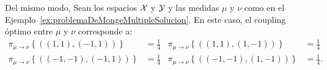 {{\begin{example}
	  \end{example}

	  \begin{example}
		  Del mismo modo, Sean los espacios $\mathcal{X}$ y $\mathcal{Y}$ y las medidas $\mu$ y $\nu$ como en el Ejemplo~\ref*{ex:problemaDeMongeMultipleSolucion}. En este caso, el coupling óptimo entre $\mu$ y $\nu$ corresponde a:
		  \begin{align*}
			  \pi_{\mu \to \nu}\left\{ ((1, 1), (-1, 1)) \right\}   & = \frac{1}{4} & \pi_{\mu \to \nu}\left\{ ((1, 1), (1, -1)) \right\}   & = \frac{1}{4}  \\
			  \pi_{\mu \to \nu}\left\{ ((-1, -1), (-1, 1)) \right\} & = \frac{1}{4} & \pi_{\mu \to \nu}\left\{ ((-1, -1), (1, -1)) \right\} & = \frac{1}{4}.
		  \end{align*}

	  \end{example}





	  \newpage


}}
